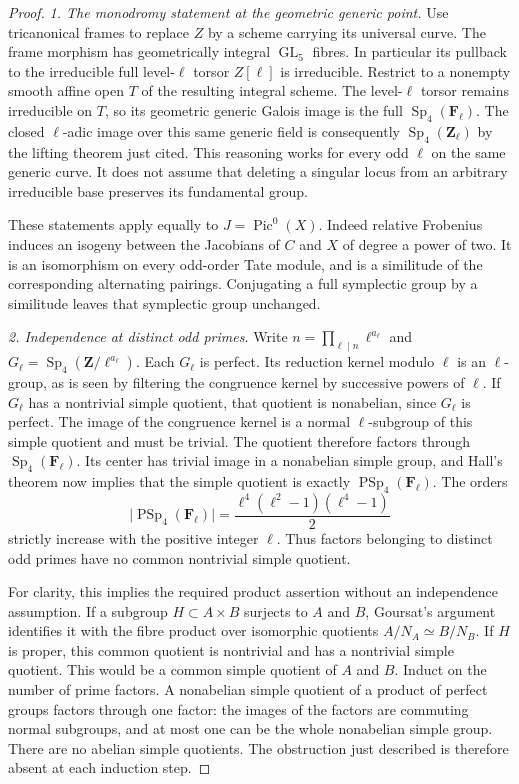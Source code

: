 \documentclass[11pt,a4paper]{article}
\begin{document}
\begin{proof}
\emph{1. The monodromy statement at the geometric generic
point.}
Use tricanonical frames to replace $Z$ by a scheme carrying
its universal curve.  The frame morphism has geometrically
integral $\operatorname{GL}_5$ fibres.  In particular its
pullback to the irreducible full level-$\ell$ torsor
$Z[\ell]$ is irreducible.  Restrict to a nonempty smooth
affine open $T$ of the resulting integral scheme.  The
level-$\ell$ torsor remains irreducible on $T$, so its
geometric generic Galois image is the full
$\operatorname{Sp}_4(\mathbf F_\ell)$.
The closed $\ell$-adic image over this same generic field
is consequently $\operatorname{Sp}_4(\mathbf Z_\ell)$ by
the lifting theorem just cited.  This reasoning works for
every odd $\ell$ on the same generic curve.  It does not
assume that deleting a singular locus from an arbitrary
irreducible base preserves its fundamental group.

These statements apply equally to $J=\operatorname{Pic}^0(X)$.
Indeed relative Frobenius induces an isogeny between the
Jacobians of $C$ and $X$ of degree a power of two.  It is an
isomorphism on every odd-order Tate module, and is a
similitude of the corresponding alternating pairings.
Conjugating a full symplectic group by a similitude leaves
that symplectic group unchanged.

\emph{2. Independence at distinct odd primes.}
Write $n=\prod_{\ell\mid n}\ell^{a_\ell}$ and
$G_\ell=\operatorname{Sp}_4(\mathbf Z/\ell^{a_\ell})$.
Each $G_\ell$ is perfect.  Its reduction kernel modulo
$\ell$ is an $\ell$-group, as is seen by filtering the
congruence kernel by successive powers of $\ell$.
If $G_\ell$ has a nontrivial simple quotient, that quotient
is nonabelian, since $G_\ell$ is perfect.  The image of the
congruence kernel is a normal $\ell$-subgroup of this simple
quotient and must be trivial.  The quotient therefore
factors through $\operatorname{Sp}_4(\mathbf F_\ell)$.
Its center has trivial image in a nonabelian simple group,
and Hall's theorem now implies that the simple quotient is
exactly $\operatorname{PSp}_4(\mathbf F_\ell)$.
The orders
\[
 \bigl|\operatorname{PSp}_4(\mathbf F_\ell)\bigr|
       =\frac{\ell^4(\ell^2-1)(\ell^4-1)}2                  \tag{GO.2}
\]
strictly increase with the positive integer $\ell$.
Thus factors belonging to distinct odd primes have no
common nontrivial simple quotient.

For clarity, this implies the required product assertion
without an independence assumption.  If a subgroup
$H\subset A\times B$ surjects to $A$ and $B$, Goursat's
argument identifies it with the fibre product over
isomorphic quotients $A/N_A\simeq B/N_B$.  If $H$ is
proper, this common quotient is nontrivial and has a
nontrivial simple quotient.  This would be a common simple
quotient of $A$ and $B$.  Induct on the number of prime
factors.  A nonabelian simple quotient of a product of
perfect groups factors through one factor: the images of
the factors are commuting normal subgroups, and at most
one can be the whole nonabelian simple group.  There are
no abelian simple quotients.  The obstruction just
described is therefore absent at each induction step.


\end{proof}
\end{document}
